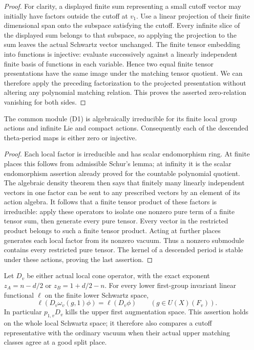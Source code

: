\begin{proof}
For clarity, a displayed finite sum representing a small cutoff
vector may initially have factors outside the cutoff at \(v_1\).
Use a linear projection of their finite dimensional span onto the
subspace satisfying the cutoff. Every infinite slice of the
displayed sum belongs to that subspace, so applying the projection
to the sum leaves the actual Schwartz vector unchanged.
The finite tensor embedding into functions is injective:
evaluate successively against a linearly independent finite basis
of functions in each variable. Hence two equal finite tensor
presentations have the same image under the matching tensor
quotient. We can therefore apply the preceding factorization to
the projected presentation without altering any polynomial
matching relation. This proves the asserted zero-relation
vanishing for both sides.
\end{proof}

\begin{srlemma}
\label{lem:sr-theta-nonzero-period-injective}
The common module (D1) is algebraically irreducible for its finite
local group actions and infinite Lie and compact actions.
Consequently each of the descended theta-period maps is either
zero or injective.
\end{srlemma}

\begin{proof}
Each local factor is irreducible and has scalar endomorphism ring.
At finite places this follows from admissible Schur's lemma; at
infinity it is the scalar endomorphism assertion already proved
for the countable polynomial quotient.
The algebraic density theorem then says that finitely many
linearly independent vectors in one factor can be sent to any
prescribed vectors by an element of its action algebra.
It follows that a finite tensor product of these factors is
irreducible: apply these operators to isolate one nonzero pure
term of a finite tensor sum, then generate every pure tensor.
Every vector in the restricted product belongs to such a finite
tensor product. Acting at further places generates each local
factor from its nonzero vacuum. Thus a nonzero submodule contains
every restricted pure tensor. The kernel of a descended period
is stable under these actions, proving the last assertion.
\end{proof}

\begin{srlemma}
\label{lem:sr-theta-cone-augmentation}
Let \(D_v\) be either actual local cone operator, with the exact
exponent \(z_A=n-d/2\) or \(z_B=1+d/2-n\).
For every lower first-group invariant linear functional
\(\ell\) on the finite lower Schwartz space,
\[
    \ell(D_v\omega_v(g,1)\phi)=\ell(D_v\phi)
               \qquad(g\in U(X)(F_v)).
 \tag{D2}\label{eq:sr-theta-cone-augmentation}
\]
In particular \(p_{1,v}D_v\) kills the upper first augmentation
space. This assertion holds on the whole local Schwartz space;
it therefore also compares a cutoff representative with the
ordinary vacuum when their actual upper matching classes agree
at a good split place.
\end{srlemma}

